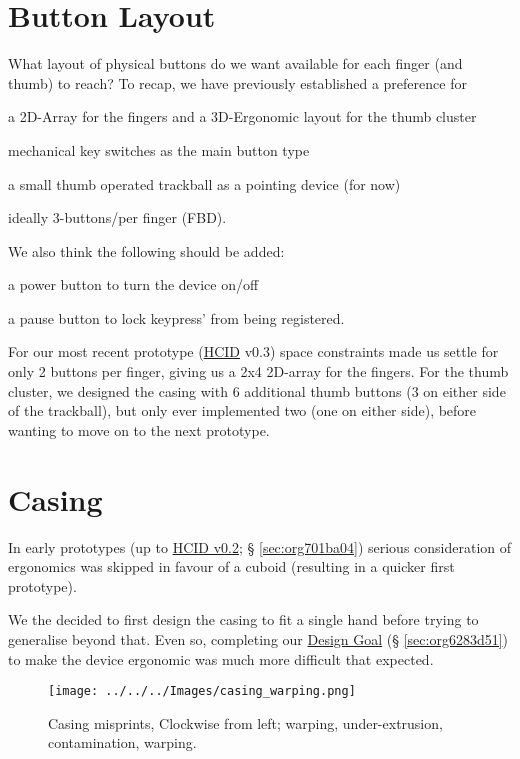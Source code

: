 \documentclass[logo,bsc,singlespacing,parskip]{infthesis}
\begin{document}
\section{Button Layout}
\label{sec:org6989e6b}
What layout of physical buttons do we want available for each finger (and thumb) to reach?
To recap, we have previously established a preference for
\begin{enumerate*}[label={\arabic*)}, itemjoin={, \,}, itemjoin*={, and \,}]
\item a 2D-Array for the fingers and a 3D-Ergonomic layout for the thumb cluster
\item mechanical key switches as the main button type
\item a small thumb operated trackball as a pointing device (for now)
\item ideally 3-buttons/per finger (FBD).
\end{enumerate*}
We also think the following should be added:
\begin{enumerate*}[label={\arabic*)}, itemjoin={, \,}, itemjoin*={, and \,}]
\item a power button to turn the device on/off
\item a pause button to lock keypress' from being registered.
\end{enumerate*}

For our most recent prototype (\hyperref[orgf95a76e]{HCID} v0.3) space constraints made us settle for only 2 buttons per finger, giving us a 2x4 2D-array for the fingers.
For the thumb cluster, we designed the casing with 6 additional thumb buttons (3 on either side of the trackball), but only ever implemented two (one on either side), before wanting to move on to the next prototype.
\section{Casing}
\label{sec:orgfd94244}
In early prototypes (up to \hyperref[sec:org701ba04]{HCID v0.2}; § \ref{sec:org701ba04}) serious consideration of ergonomics was skipped in favour of a cuboid (resulting in a quicker first prototype).

We the decided to first design the casing to fit a single hand before trying to generalise beyond that.
Even so, completing our \hyperref[sec:org6283d51]{Design Goal} (§ \ref{sec:org6283d51}) to make the device ergonomic was much more difficult that expected.

\begin{wrapfigure}{r}{0.6\textwidth}
\centering
\texttt{[image: ../../../Images/casing\_warping.png]}
\caption[Casing misprints]{\label{fig:casing_misprints}Casing misprints, Clockwise from left; warping, under-extrusion, contamination, warping.}
\end{wrapfigure}
\end{document}
